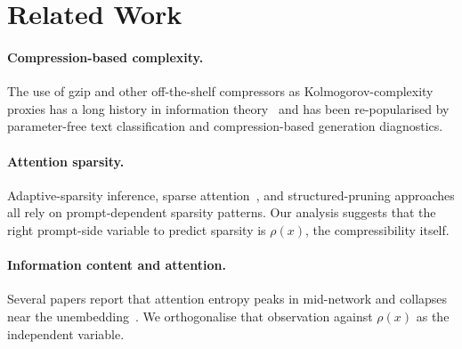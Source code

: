 \section{Related Work}
\paragraph{Compression-based complexity.}
The use of gzip and other off-the-shelf compressors as Kolmogorov-complexity
proxies has a long history in information theory~\cite{li2008introduction}
and has been re-popularised by parameter-free text classification
\cite{jiang2023low} and compression-based generation diagnostics.

\paragraph{Attention sparsity.} Adaptive-sparsity inference, sparse
attention~\cite{child2019sparse}, and structured-pruning approaches
all rely on prompt-dependent sparsity patterns. Our analysis suggests
that the right prompt-side variable to predict sparsity is
$\rho(x)$, the compressibility itself.

\paragraph{Information content and attention.} Several papers report
that attention entropy peaks in mid-network and collapses near the
unembedding~\cite{voita2019analyzing,clark2019does}. We orthogonalise
that observation against $\rho(x)$ as the independent variable.
